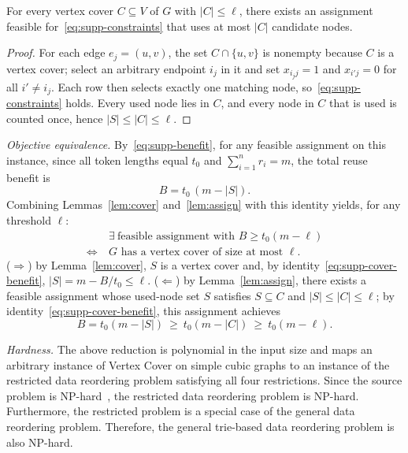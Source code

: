 \begin{lemma}
\label{lem:assign}
For every vertex cover
$C\subseteq V$ of $G$ with $|C|\leq\ell$, there exists an assignment
feasible for~\eqref{eq:supp-constraints} that uses at most $|C|$ candidate
nodes.
\end{lemma}

\begin{proof}
For each edge $e_j=(u,v)$, the set $C\cap\{u,v\}$ is nonempty
because $C$ is a vertex cover; select an arbitrary endpoint $i_j$ in it and
set $x_{i_j j}=1$ and $x_{i'j}=0$ for all $i'\neq i_j$. Each row then selects
exactly one matching node, so~\eqref{eq:supp-constraints} holds. Every used
node lies in $C$, and every node in $C$ that is used is counted once, hence
$|S|\leq|C|\leq\ell$. 
\end{proof}

\emph{Objective equivalence.} By~\eqref{eq:supp-benefit}, for any feasible
assignment on this instance, since all token lengths equal $t_0$ and
$\sum_{i=1}^{n}r_i=m$, the total reuse benefit is
\begin{equation}
B = t_0\,(m-|S|).
\label{eq:supp-cover-benefit}
\end{equation}
Combining Lemmas~\ref{lem:cover} and~\ref{lem:assign} with this
identity yields, for any threshold $\ell$:
\begin{equation}
\begin{aligned}
&\exists\ \text{feasible assignment with } B\geq t_0(m-\ell)\\
\iff\ & G \text{ has a vertex cover of size at most } \ell.
\end{aligned}
\label{eq:supp-equivalence}
\end{equation}
($\Rightarrow$) by Lemma~\ref{lem:cover}, $S$ is a vertex cover and,
by identity~\eqref{eq:supp-cover-benefit}, $|S|=m-B/t_0\leq\ell$.
($\Leftarrow$) by Lemma~\ref{lem:assign}, there exists a
feasible assignment whose used-node set $S$ satisfies
$S\subseteq C$ and $|S|\leq|C|\leq\ell$; by
identity~\eqref{eq:supp-cover-benefit}, this assignment achieves
\[
B=t_0(m-|S|)\ \geq\ t_0(m-|C|)\ \geq\ t_0(m-\ell).
\]

\emph{Hardness.} 
The above reduction is polynomial in the input size and
maps an arbitrary instance of Vertex Cover on simple cubic graphs to an
instance of the restricted data reordering problem satisfying all four restrictions. Since the source
problem is NP-hard~\cite{AlimontiKann2000}, the restricted data
reordering problem is NP-hard. Furthermore, the restricted problem is a
special case of the general data reordering problem. Therefore, the
general trie-based data reordering problem is also NP-hard.
